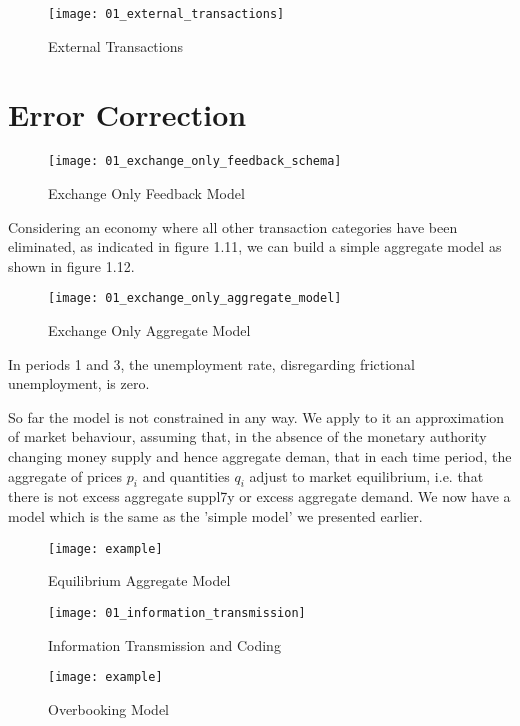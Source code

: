 \begin{figure}
\centering
\texttt{[image: 01\_external\_transactions]}
\caption{External Transactions}
\label{fig:external_transactions}
\end{figure}

\section{Error Correction}

\begin{figure}
\centering
\texttt{[image: 01\_exchange\_only\_feedback\_schema]}
\caption{Exchange Only Feedback Model}
\label{fig:exchange_only_feedback_schema}
\end{figure}

Considering an economy where all other transaction categories have been eliminated, as
indicated in figure 1.11, we can build a simple aggregate model as shown in figure 1.12.

\begin{figure}
\centering
\texttt{[image: 01\_exchange\_only\_aggregate\_model]}
\caption{Exchange Only Aggregate Model}
\label{fig:exchange_only_aggregate_model}
\end{figure}

In periods 1 and 3, the unemployment rate, disregarding frictional unemployment, is zero.

So far the model is not constrained in any way. We apply to it an approximation of market behaviour,
assuming that, in the absence of the monetary authority changing money supply and hence aggregate
deman, that in each time period, the aggregate of prices \(p_i\) and quantities \(q_i\) adjust to
market equilibrium, i.e. that there is not excess aggregate suppl7y or excess aggregate demand. We
now have a model which is the same as the 'simple model' we presented earlier.

\begin{figure}
\centering
\texttt{[image: example]}
\caption{Equilibrium Aggregate Model}
\label{fig:equilibrium_aggregate_model}
\end{figure}

\begin{figure}
\centering
\texttt{[image: 01\_information\_transmission]}
\caption{Information Transmission and Coding}
\label{fig:information_transmission}
\end{figure}

\begin{figure}
\centering
\texttt{[image: example]}
\caption{Overbooking Model}
\label{fig:overbooking}
\end{figure}

